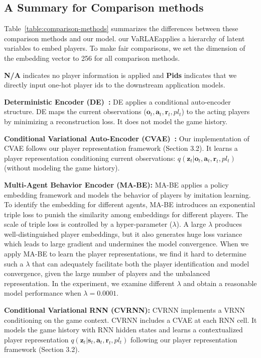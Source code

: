 \documentclass{article}
\newcommand{\latentvariables}{\mathbf{z}}
\newcommand{\state}{\mathbf{s}}
\newcommand{\action}{\mathbf{a}}
\newcommand{\reward}{\boldsymbol{r}}
\newcommand{\player}{pl}
\newcommand{\observation}{\boldsymbol{o}}
\newcommand{\system}{VaRLAE\;}
\begin{document}
\subsection{A Summary for Comparison methods}
Table~\ref{table:comparison-methods} summarizes the differences between these comparison methods and our model. our \system applies a hierarchy of latent variables to embed players. To make fair comparisons, we set the dimension of the embedding vector to 256 for all comparison methods.

{\bf N/A} indicates no player information is applied and {\bf Pids} indicates that we directly input one-hot player ids to the downstream application models.

{\bf Deterministic Encoder (DE)~\cite{ganguly2018problem}:} DE applies a conditional auto-encoder structure. DE maps the current observations ($\observation_{t},\action_{t},\reward_{t},\player_{t}$) to the acting players by minimizing a reconstruction loss. It does not model the game history.

{\bf Conditional Variational Auto-Encoder (CVAE)~\cite{WalkerDGH16}:} Our implementation of CVAE follows our player representation framework (Section 3.2). It learns a player representation conditioning current observations: $q(\latentvariables_{t}|\observation_{t},\action_{t},\reward_{t},\player_{t})$ (without modeling the game history).

{\bf Multi-Agent Behavior Encoder (MA-BE)\cite{GroverRepresent18}:} MA-BE applies a policy embedding framework and models the behavior of players by imitation learning. To identify the embedding for different agents, MA-BE introduces an exponential triple loss to punish the similarity among embeddings for different players. The scale of triple loss is controlled by a hyper-parameter ($\lambda$). A large $\lambda$ produces well-distinguished player embeddings, but it also generates huge loss variance which leads to large gradient and undermines the model convergence. When we apply MA-BE to learn the player representations, we find it hard to determine such a $\lambda$ that can adequately facilitate both the player identification and model convergence, given the large number of players and the unbalanced representation. In the experiment, we examine different $\lambda$ and obtain a reasonable model performance when $\lambda= 0.0001$.

{\bf Conditional Variational RNN (CVRNN):} CVRNN implements a VRNN~\cite{ChungKDGCB15} conditioning on the game context. CVRNN includes a CVAE at each RNN cell. It models the game history with RNN hidden states and learns a contextualized player representation $q(\latentvariables_{t}|\state_{t},\action_{t},\reward_{t},\player_{t})$ following our player representation framework (Section 3.2).
\end{document}

